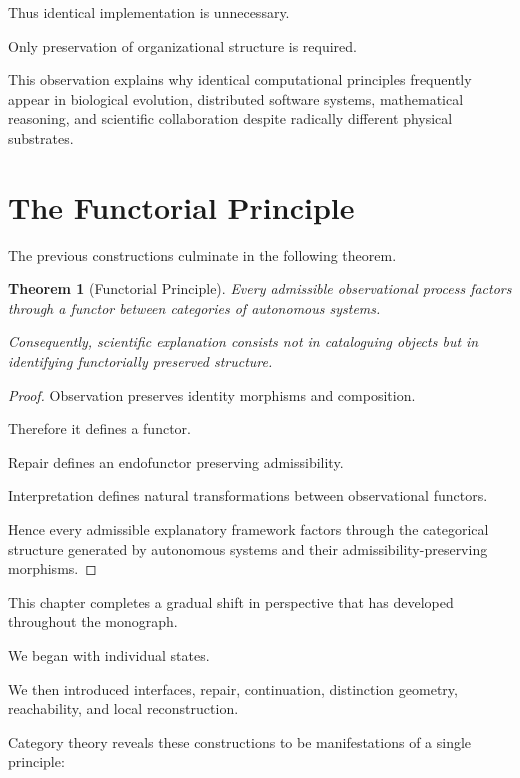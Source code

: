 \documentclass[11pt,oneside]{book}
\numberwithin{equation}{chapter}
\theoremstyle{definition}
\theoremstyle{plain}
\newtheorem{theorem}[definition]{Theorem}
\begin{document}
Thus identical implementation is unnecessary.

Only preservation of organizational structure is required.

This observation explains why identical computational principles frequently
appear in biological evolution, distributed software systems, mathematical
reasoning, and scientific collaboration despite radically different physical
substrates.

\section{The Functorial Principle}

The previous constructions culminate in the following theorem.

\begin{theorem}[Functorial Principle]

Every admissible observational process factors through a functor between
categories of autonomous systems.

Consequently, scientific explanation consists not in cataloguing objects but
in identifying functorially preserved structure.

\end{theorem}

\begin{proof}

Observation preserves identity morphisms and composition.

Therefore it defines a functor.

Repair defines an endofunctor preserving admissibility.

Interpretation defines natural transformations between observational
functors.

Hence every admissible explanatory framework factors through the categorical
structure generated by autonomous systems and their admissibility-preserving
morphisms.

\end{proof}

This chapter completes a gradual shift in perspective that has developed
throughout the monograph.

We began with individual states.

We then introduced interfaces, repair, continuation, distinction geometry,
reachability, and local reconstruction.

Category theory reveals these constructions to be manifestations of a single
principle:
\end{document}
